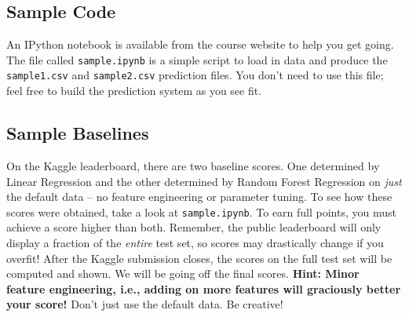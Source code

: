 \documentclass[12pt]{article}
\begin{document}
	\subsection*{Sample Code}
	An IPython notebook is available from the course website to help you get going.  The file called \verb|sample.ipynb| is a simple script to load in data and produce the \verb|sample1.csv| and \verb|sample2.csv| prediction files.  You don't need to use this file; feel free to build the prediction system as you see fit.
	
	\subsection*{Sample Baselines}
	On the Kaggle leaderboard, there are two baseline scores.  One determined by Linear Regression and the other determined by Random Forest Regression on \textit{just} the default data -- no feature engineering or parameter tuning.  To see how these scores were obtained, take a look at \verb|sample.ipynb|.  To earn full points, you must achieve a score higher than both.  Remember, the public leaderboard will only display a fraction of the \textit{entire} test set, so scores may drastically change if you overfit!  After the Kaggle submission closes, the scores on the full test set will be computed and shown.  We will be going off the final scores. 
	\textbf{Hint: Minor feature engineering, i.e., adding on more features will graciously better your score!}  Don't just use the default data.  Be creative!
	
\end{document}
